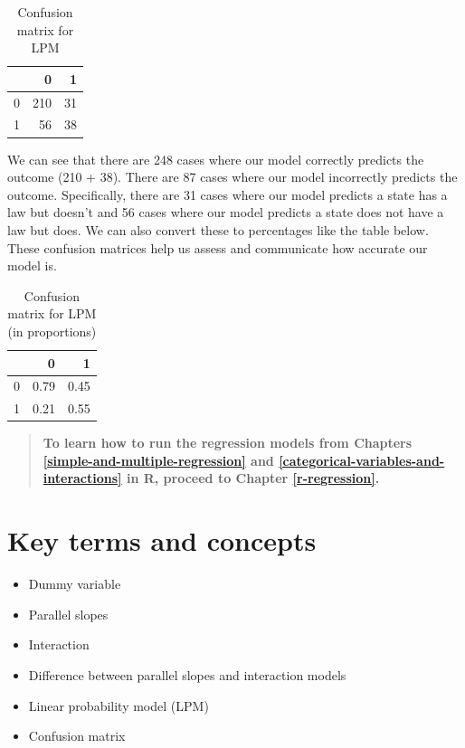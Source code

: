 \documentclass[
]{book}
\providecommand{\tightlist}{%
  \setlength{\itemsep}{0pt}\setlength{\parskip}{0pt}}
\begin{document}
\begin{table}

\caption{\label{tab:confumat}Confusion matrix for LPM}
\centering
\begin{tabular}[t]{l|r|r}
\hline
  & 0 & 1\\
\hline
0 & 210 & 31\\
\hline
1 & 56 & 38\\
\hline
\end{tabular}
\end{table}

We can see that there are 248 cases where our model correctly predicts the outcome (210 + 38). There are 87 cases where our model incorrectly predicts the outcome. Specifically, there are 31 cases where our model predicts a state has a law but doesn't and 56 cases where our model predicts a state does not have a law but does. We can also convert these to percentages like the table below. These confusion matrices help us assess and communicate how accurate our model is.

\begin{table}

\caption{\label{tab:unnamed-chunk-37}Confusion matrix for LPM (in proportions)}
\centering
\begin{tabular}[t]{l|r|r}
\hline
  & 0 & 1\\
\hline
0 & 0.79 & 0.45\\
\hline
1 & 0.21 & 0.55\\
\hline
\end{tabular}
\end{table}

\begin{quote}
\textbf{To learn how to run the regression models from Chapters \ref{simple-and-multiple-regression} and \ref{categorical-variables-and-interactions} in R, proceed to Chapter \ref{r-regression}.}
\end{quote}

\hypertarget{kt7}{%
\section{Key terms and concepts}\label{kt7}}

\begin{itemize}
\tightlist
\item
  Dummy variable
\item
  Parallel slopes
\item
  Interaction
\item
  Difference between parallel slopes and interaction models
\item
  Linear probability model (LPM)
\item
  Confusion matrix
\end{itemize}
\end{document}
